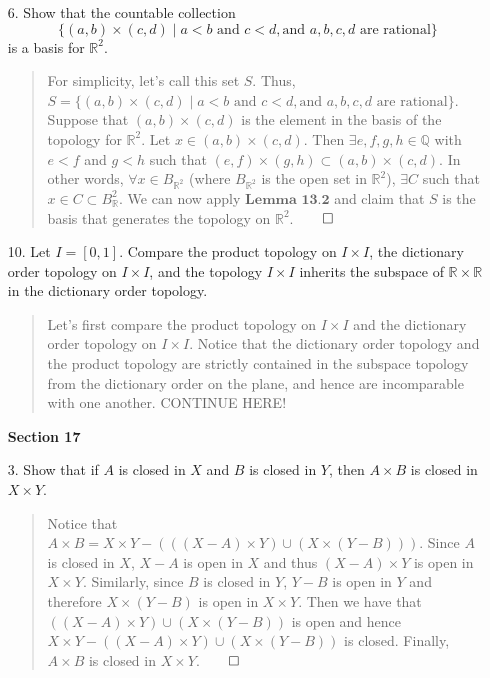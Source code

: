 \documentclass[12pt, a4paper]{article}
\newcommand{\rats}{\mathbb{Q}} %
\newcommand{\reals}{\mathbb{R}} %
\begin{document}
\begin{itemize}
\item[6.]
Show that the countable collection
$$\{(a, b) \times (c, d) \mid a < b \mbox{ and } c < d, \mbox{and } a,b,c,d \mbox{ are rational}\}$$
is a basis for $\reals^2$.
\begin{quote}
For simplicity, let's call this set $S$. Thus, $S = \{(a, b) \times (c, d) \mid a < b \mbox{ and } c < d, \mbox{and } a,b,c,d \mbox{ are rational}\}$.
\newline
\newline
Suppose that $(a, b) \times (c, d)$ is the element in the basis of the topology for $\reals^2$. Let $x \in (a, b) \times (c, d)$.
Then $\exists e, f, g, h \in \rats$ with $e < f$ and $g < h$ such that $(e, f) \times (g, h) \subset (a, b) \times (c, d)$.
In other words, $\forall x \in B_{\reals^2}$ (where $B_{\reals^2}$ is the open set in $\reals^2$), $\exists C$ such that
$x \in C \subset B_\reals^2$. We can now apply $\textbf{Lemma 13.2}$ and claim that $S$ is the basis that generates the topology on $\reals^2$.$\qed$
\end{quote}

\item[]
\item[]

\item[10.]
Let $I = [0, 1]$. Compare the product topology on $I \times I$, the dictionary order
topology on $I \times I$, and the topology $I \times I$ inherits the subspace of $\reals \times \reals$
in the dictionary order topology.
\begin{quote}
Let's first compare the product topology on $I \times I$ and the dictionary order topology on $I \times I$.
Notice that the dictionary order topology and the product topology are strictly contained in the subspace
topology from the dictionary order on the plane, and hence are incomparable with one another.
\newline
\newline
CONTINUE HERE!
\end{quote}

\item[]
\item[]
\item[]

{\large \textbf{Section 17}}
\vspace{0.3cm}
\item[3.]
Show that if $A$ is closed in $X$ and $B$ is closed in $Y$, then $A \times B$ is closed in $X \times Y$.
\begin{quote}
Notice that $A \times B = X \times Y - (((X - A) \times Y) \cup (X \times (Y - B)))$.
Since $A$ is closed in $X$, $X - A$ is open in $X$ and thus $(X - A) \times Y$ is open in $X \times Y$.
Similarly, since $B$ is closed in $Y$, $Y - B$ is open in $Y$ and therefore $X \times (Y - B)$ is open in $X \times Y$.
Then we have that $((X - A) \times Y) \cup (X \times (Y - B))$ is open and hence $X \times Y - ((X - A) \times Y) \cup (X \times (Y - B))$
is closed. Finally, $A \times B$ is closed in $X \times Y$.$\qed$
\end{quote}


\end{itemize}
\end{document}
